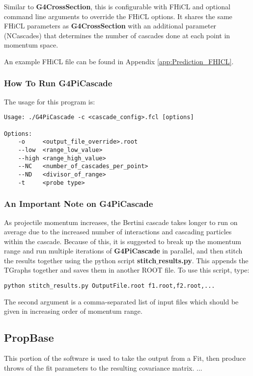 \documentclass[12pt]{article}
\begin{document}
Similar to \textbf{G4CrossSection}, this is configurable with FHiCL and optional command line arguments to override the FHiCL options. It shares the same FHiCL parameters as \textbf{G4CrossSection} with an additional parameter (NCascades) that determines the number of cascades done at each point in momentum space. 

An example FHiCL file can be found in Appendix \ref{app:Prediction_FHICL}.
\newpage
\subsubsection{How To Run G4PiCascade}
The usage for this program is: 

\begin{minipage}{\linewidth}
\begin{lstlisting}
Usage: ./G4PiCascade -c <cascade_config>.fcl [options]

Options: 
	-o     <output_file_override>.root
	--low  <range_low_value> 
	--high <range_high_value> 
	--NC   <number_of_cascades_per_point> 
	--ND   <divisor_of_range> 
	-t     <probe type> 
\end{lstlisting}
\end{minipage}

\subsubsection{An Important Note on G4PiCascade}\label{note:G4PiCascade}
As projectile momentum increases, the Bertini cascade takes longer to run on average due to the increased number of interactions and cascading particles within the cascade. Because of this, it is suggested to break up the momentum range and run multiple iterations of \textbf{G4PiCascade} in parallel, and then stitch the results together using the python script \textbf{stitch$\_$results.py}. This appends the TGraphs together and saves them in another ROOT file. To use this script, type:


\begin{minipage}{\linewidth}
\begin{lstlisting}
python stitch_results.py OutputFile.root f1.root,f2.root,...
\end{lstlisting}
\end{minipage}
The second argument is a comma-separated list of input files which should be given in increasing order of momentum range.
\subsection{PropBase}
This portion of the software is used to take the output from a Fit, then produce throws of the fit parameters to the resulting covariance matrix.  ... 
\end{document}
